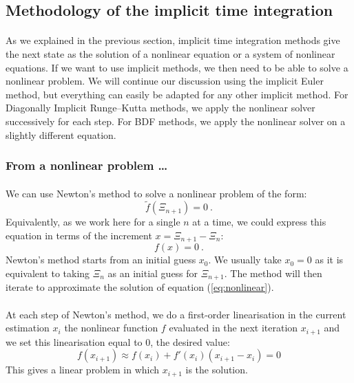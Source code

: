     \subsection{Methodology of the implicit time integration}

      \paragraph{}
      As we explained in the previous section, implicit time integration methods give the next state as the solution of a nonlinear equation or a system of nonlinear equations.
      If we want to use implicit methods, we then need to be able to solve a nonlinear problem.
      We will continue our discussion using the implicit Euler method, but everything can easily be adapted for any other implicit method.
      For Diagonally Implicit Runge--Kutta methods, we apply the nonlinear solver successively for each step.
      For BDF methods, we apply the nonlinear solver on a slightly different equation.


      \subsubsection{From a nonlinear problem \dots}

      	\paragraph{}
      	We can use Newton's method to solve a nonlinear problem of the form:
      	\begin{equation}
      		\tilde{f}\left(\Xi_{n+1}\right) = 0 \ .
      	\end{equation}
        Equivalently, as we work here for a single $n$ at a time, we could express this equation in terms of the increment $x = \Xi_{n+1} - \Xi_n$:
        \begin{equation}\label{eq:nonlinear}
      		f\left(x\right) = 0 \ .
      	\end{equation}
        Newton's method starts from an initial guess $x_0$.
        We usually take $x_0 = 0$ as it is equivalent to taking $\Xi_n$ as an initial guess for $\Xi_{n+1}$.
        The method will then iterate to approximate the solution of equation (\ref{eq:nonlinear}).

        \paragraph{}
        At each step of Newton's method, we do a first-order linearisation in the current estimation $x_i$ the nonlinear function $f$ evaluated  in the next iteration $x_{i+1}$ and we set this linearisation equal to 0, the desired value:
        \begin{equation}\label{eq:nonlinear_linearised}
          f\left(x_{i+1}\right) \approx f\left(x_i\right) + f'\left(x_i\right) \left( x_{i+1} - x_i \right) = 0
        \end{equation}
        This gives a linear problem in which $x_{i+1}$ is the solution.


